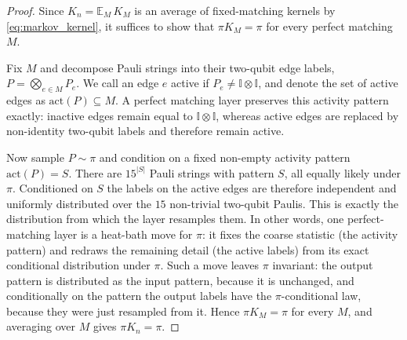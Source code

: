 \documentclass[
    aps,
    superscriptaddress,
    onecolumn,
    10pt,
    prx,
    nofootinbib
]{revtex4-2}
\theoremstyle{namedstatement}
\theoremstyle{plain}
\begin{document}
\begin{proof}
Since $K_n = \mathbb{E}_{M}\, K_M$ is an average of fixed-matching kernels by \cref{eq:markov_kernel}, it suffices to show that $\pi K_M = \pi$ for every perfect matching $M$.
 
Fix $M$ and decompose Pauli strings into their two-qubit edge labels, $P = \bigotimes_{e \in M} P_e$. We call an edge $e$ active if $P_e \neq \mathbb{I}\otimes\mathbb{I}$, and denote the set of active edges as $\mathrm{act}(P) \subseteq M$. A perfect matching layer preserves this activity pattern exactly: inactive edges remain equal to $\mathbb{I}\otimes\mathbb{I}$, whereas active edges are replaced by non-identity two-qubit labels and therefore remain active.
 
Now sample $P \sim \pi$ and condition on a fixed non-empty activity pattern $\mathrm{act}(P) = S$. There are $15^{|S|}$ Pauli strings with pattern $S$, all equally likely under $\pi$. Conditioned on $S$ the labels on the active edges are therefore independent and uniformly distributed over the $15$ non-trivial two-qubit Paulis. This is exactly the distribution from which the layer resamples them. In other words, one perfect-matching layer is a heat-bath move for $\pi$: it fixes the coarse statistic (the activity pattern) and redraws the remaining detail (the active labels) from its exact conditional distribution under $\pi$. Such a move leaves $\pi$ invariant: the output pattern is distributed as the input pattern, because it is unchanged, and conditionally on the pattern the output labels have the $\pi$-conditional law, because they were just resampled from it. Hence $\pi K_M = \pi$ for every $M$, and averaging over $M$ gives $\pi K_n = \pi$.
\end{proof}
\end{document}
